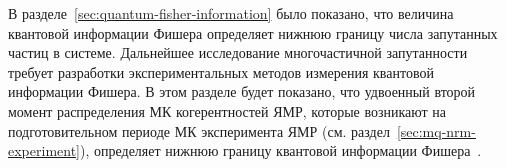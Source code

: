 %
%

%
%
%
%
%

%

В разделе~\ref{sec:quantum-fisher-information} было показано,
что величина квантовой информации Фишера определяет нижнюю границу числа запутанных частиц в системе.
Дальнейшее исследование многочастичной запутанности требует
разработки экспериментальных методов измерения квантовой информации Фишера.
В этом разделе будет показано,
что удвоенный второй момент распределения МК когерентностей ЯМР,
которые возникают на подготовительном периоде МК эксперимента ЯМР
(см. раздел~\ref{sec:mq-nrm-experiment}),
определяет нижнюю границу квантовой информации Фишера~\cite{Garttner2018}.

